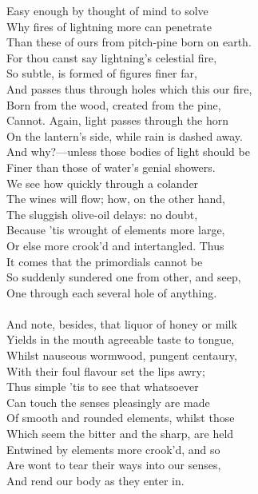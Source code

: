Easy enough by thought of mind to solve\\
Why fires of lightning more can penetrate\\
Than these of ours from pitch-pine born on earth.\\
For thou canst say lightning's celestial fire,\\
So subtle, is formed of figures finer far,\\
And passes thus through holes which this our fire,\\
Born from the wood, created from the pine,\\
Cannot. Again, light passes through the horn\\
On the lantern's side, while rain is dashed away.\\
And why?—unless those bodies of light should be\\
Finer than those of water's genial showers.\\
We see how quickly through a colander\\
The wines will flow; how, on the other hand,\\
The sluggish olive-oil delays: no doubt,\\
Because 'tis wrought of elements more large,\\
Or else more crook'd and intertangled. Thus\\
It comes that the primordials cannot be\\
So suddenly sundered one from other, and seep,\\
One through each several hole of anything.\\
\\
And note, besides, that liquor of honey or milk\\
Yields in the mouth agreeable taste to tongue,\\
Whilst nauseous wormwood, pungent centaury,\\
With their foul flavour set the lips awry;\\
Thus simple 'tis to see that whatsoever\\
Can touch the senses pleasingly are made\\
Of smooth and rounded elements, whilst those\\
Which seem the bitter and the sharp, are held\\
Entwined by elements more crook'd, and so\\
Are wont to tear their ways into our senses,\\
And rend our body as they enter in.\\
